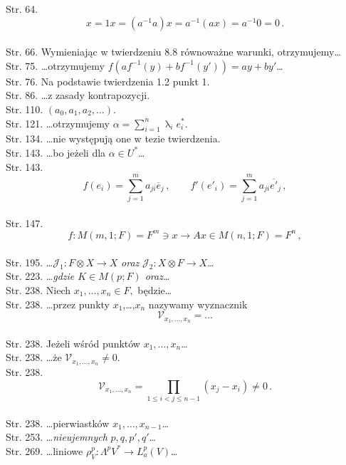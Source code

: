 \documentclass[a4paper,11pt]{article}
\numberwithin{equation}{section}
\renewcommand{\lambda}{\uplambda}
\begin{document}
Str. 64.
  $$x = 1 x = ( a^{ -1 } a ) x = a^{ -1 }( a x ) = a^{ -1 } 0 = 0 \,
  .$$ \\
Str. 66. Wymieniając w twierdzeniu 8.8 równoważne warunki,
otrzymujemy\ldots \\
Str. 75. \ldots otrzymujemy
$f( a f^{ -1 }( y ) + b f^{ -1 } ( y' ) ) = a y + b y'$\ldots \\
Str. 76. Na podstawie twierdzenia 1.2 punkt 1. \\
Str. 86. \ldots z zasady kontrapozycji. \\
Str. 110. $( a_{ 0 }, a_{ 1 }, a_{ 2 }, \ldots )$. \\
Str. 121. \ldots otrzymujemy
$\alpha = \sum_{ i = 1 }^{ n } \lambda_{ i } e^{ * }_{ i } .$ \\
Str. 134. \ldots nie występują one w tezie twierdzenia. \\
Str. 143. \ldots bo jeżeli dla $\alpha \in U^{ * }$\ldots \\
Str. 143.
  $$f( e_{ i } ) = \sum_{ j = 1 }^{ m } a_{ j i } \overline{ { e } }_{
    j } \, , \qquad f'( e'_{ i } ) = \sum_{ j = 1 }^{ m } a_{ j i } \overline{
    { e }' }_{ j } \, ,$$ \\
Str. 147.
$$f : M( m, 1; F ) = F^{ m } \ni x \longrightarrow A x \in M( n, 1 ;
F ) = F^{ n } \, ,$$ \\
Str. 195.
\ldots$\mathcal{ J }_{ 1 } : F \otimes X \rightarrow X$ \textit{oraz}
$\mathcal{ J }_{ 2 } : X \otimes F \rightarrow X$\ldots \\
Str. 223. \ldots\textit{gdzie $K \in M( p; F )$ oraz}\ldots \\
Str. 238. Niech $x_{ 1 }, \ldots, x_{ n } \in F ,$ będzie\ldots \\
Str. 238. \ldots przez punkty $x_{ 1 }$,\ldots,$x_{ n }$ nazywamy
wyznacznik
$$\mathcal{ V }_{ x_{ 1 }, \ldots, x_{ n } } = \ldots$$ \\
Str. 238. Jeżeli wśród punktów $x_{ 1 },\ldots, x_{ n }$\ldots \\
Str. 238. \ldots że $\mathcal{ V }_{ x_{ 1 }, \ldots, x_{ n } } \neq 0 .$ \\
Str. 238.
$$\mathcal{ V }_{ x_{ 1 }, \ldots, x_{ n } } = \prod_{ 1 \leq i < j
  \leq n - 1 }( x_{ j } - x_{ i } ) \neq 0 \, .$$ \\
Str. 238. \ldots pierwiastków $x_{ 1 }, \ldots, x_{ n - 1 }$\ldots \\
Str. 253. \ldots \textit{nieujemnych} $p, q, p', q'$\ldots \\
Str. 269. \ldots liniowe
$\rho_{ V }^{ p } : \Lambda^{ p } V^{ * } \rightarrow L^{ p }_{ a } ( V )$\ldots \\
\end{document}
